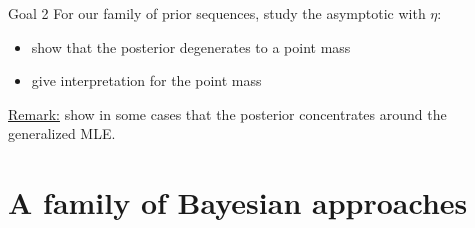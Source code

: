 \documentclass[10pt]{beamer}
\begin{document}
\begin{frame}{Goal 2}
For our family of prior sequences, study the asymptotic with $\eta$:
\begin{itemize}
\setlength\itemsep{2em}
\item show that the posterior degenerates to a point mass
\item give interpretation for the point mass
\end{itemize}

\bigskip
\bigskip

\underline{Remark:} \textsc{\citet{OBJJ}} show in some cases that the posterior concentrates around the generalized MLE.
\end{frame}

\section{A family of Bayesian approaches}
\end{document}
